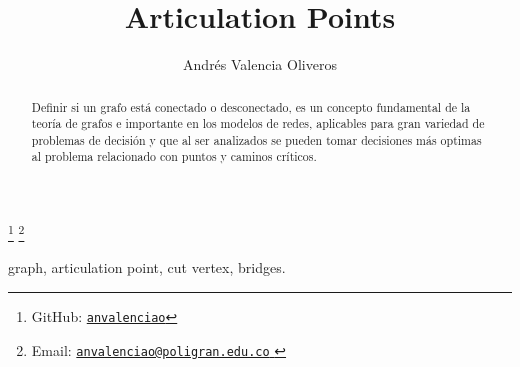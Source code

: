 \begin{frontmatter}
	\title{Articulation Points} 
	\author{Andrés Valencia Oliveros}
	\address{Facultad de Ingeniería, Diseño e Innovación\\ 
		Institución Universitaria Politécnico Grancolombiano\\
		Bogotá, Colombia
	}
	\thanks[myGitHub]{GitHub: 
		\href{https://github.com/anvalenciao/ArticulationPoints}{\texttt{anvalenciao}}
	}
	\thanks[myEmail]{Email: 
		\href{mailto:anvalenciao@poligran.edu.co}{
			\texttt{\normalshape anvalenciao@poligran.edu.co}
		}
	}

	\renewcommand{\abstractname}{\textbf{Resumen}}
	\begin{abstract}
		Definir si un grafo está conectado o desconectado, es un concepto fundamental de la teoría de grafos e importante en los modelos de redes, aplicables para gran variedad de problemas de decisión y que al ser analizados se pueden tomar decisiones más optimas al problema relacionado con puntos y caminos críticos.
	\end{abstract}

	\begin{keyword}
		graph, articulation point, cut vertex, bridges.
	\end{keyword}
\end{frontmatter}
